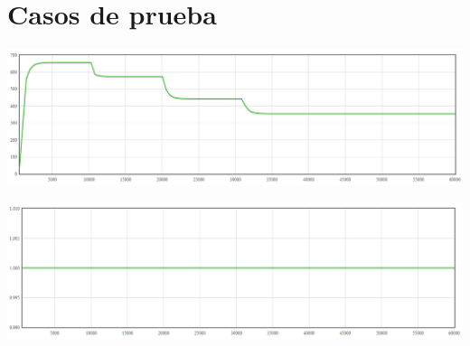 \section{Casos de prueba}

	\begin{center}
		\includegraphics{images/testcase1_1_expRespTime.png}
	\end{center}

	\begin{center}
		\includegraphics{images/testcase1_1_cost.png}
	\end{center}
